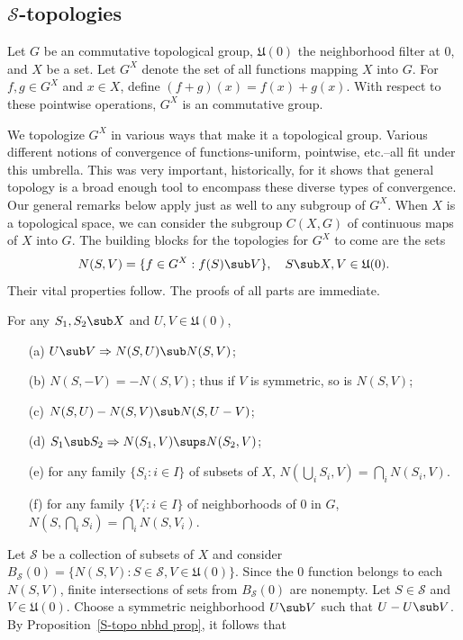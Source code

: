 \subsection{\texorpdfstring{$\mathcal{S}$}{S}-topologies}
Let $G$ be an commutative topological group, $\mathfrak{U}(0)$ the neighborhood filter at $0$, and $X$ be a set. Let $G^X$ denote the set of all functions mapping $X$ into $G$. For $f,g\in G^X$ and $x\in X$, define $(f+g)(x)=f(x)+g(x)$. With respect to these pointwise operations, $G^X$ is an commutative group.\par
We topologize $G^X$ in various ways that make it a topological group. Various different notions of convergence of functions-uniform, pointwise, etc.--all fit under this umbrella. This was very important, historically, for it shows that general topology is a broad enough tool to encompass these diverse types of convergence. Our general remarks below apply just as well to any subgroup of $G^X$. When $X$ is a topological space, we can consider the subgroup $C(X,G)$ of continuous maps of $X$ into $G$. The building blocks for the topologies for $G^X$ to come are the sets
\[N(S,V)=\{f\in G^X:f(S)\sub V\},\quad S\sub X,V\in\mathfrak{U}(0).\]
Their vital properties follow. The proofs of all parts are immediate.
\begin{proposition}\label{S-topo nbhd prop}
For any $S_1,S_2\sub X$ and $U,V\in\mathfrak{U}(0)$,
\begin{itemize}
\item[(a)] $U\sub V\Rightarrow N(S,U)\sub N(S,V)$;
\item[(b)] $N(S,-V)=-N(S,V)$; thus if $V$ is symmetric, so is $N(S,V)$;
\item[(c)] $N(S,U)-N(S,V)\sub N(S,U-V)$;
\item[(d)] $S_1\sub S_2\Rightarrow N(S_1,V)\sups N(S_2,V)$;
\item[(e)] for any family $\{S_i:i\in I\}$ of subsets of $X$, $N(\bigcup_iS_i,V)=\bigcap_iN(S_i,V)$.
\item[(f)] for any family $\{V_i:i\in I\}$ of neighborhoods of $0$ in $G$, $N(S,\bigcap_iS_i)=\bigcap_iN(S,V_i)$.
\end{itemize}
\end{proposition}
Let $\mathcal{S}$ be a collection of subsets of $X$ and consider $B_{\mathcal{S}}(0)=\{N(S,V):S\in\mathcal{S},V\in\mathfrak{U}(0)\}$. Since the $0$ function belongs to each $N(S,V)$, finite intersections of sets from $B_{\mathcal{S}}(0)$ are nonempty. Let $S\in\mathcal{S}$ and $V\in\mathfrak{U}(0)$. Choose a symmetric neighborhood $U\sub V$ such that $U-U\sub V$. By Proposition~\ref{S-topo nbhd prop}, it follows that

